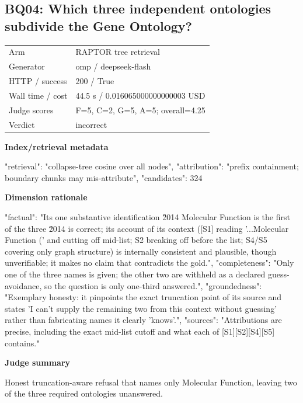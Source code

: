 \documentclass[10pt]{article}
\begin{document}
\subsection{BQ04: Which three independent ontologies subdivide the Gene Ontology?}
\begin{tabular}{@{}ll@{}}
Arm & RAPTOR tree retrieval\\
Generator & omp / deepseek-flash\\
HTTP / success & 200 / True\\
Wall time / cost & 44.5 s / 0.016065000000000003 USD\\
Judge scores & F=5, C=2, G=5, A=5; overall=4.25\\
Verdict & incorrect\\
\end{tabular}

\textbf{Index/retrieval metadata}
\begin{EvidenceText}
{
  "retrieval": "collapse-tree cosine over all nodes",
  "attribution": "prefix containment; boundary chunks may mis-attribute",
  "candidates": 324
}
\end{EvidenceText}

\textbf{Dimension rationale}
\begin{EvidenceText}
{
  "factual": "Its one substantive identification \u2014 Molecular Function is the first of the three \u2014 is correct; its account of its context ([S1] reading '...Molecular Function (' and cutting off mid-list; S2 breaking off before the list; S4/S5 covering only graph structure) is internally consistent and plausible, though unverifiable; it makes no claim that contradicts the gold.",
  "completeness": "Only one of the three names is given; the other two are withheld as a declared guess-avoidance, so the question is only one-third answered.",
  "groundedness": "Exemplary honesty: it pinpoints the exact truncation point of its source and states 'I can't supply the remaining two from this context without guessing' rather than fabricating names it clearly 'knows'.",
  "sources": "Attributions are precise, including the exact mid-list cutoff and what each of [S1][S2][S4][S5] contains."
}
\end{EvidenceText}

\textbf{Judge summary}
\begin{EvidenceText}
Honest truncation-aware refusal that names only Molecular Function, leaving two of the three required ontologies unanswered.
\end{EvidenceText}
\end{document}
